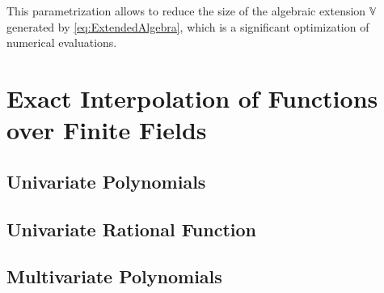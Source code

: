 This parametrization allows to reduce the size of the algebraic extension $\mathbb{V}$ generated by \cref{eq:ExtendedAlgebra},
which is a significant optimization of numerical evaluations.




\section{Exact Interpolation of Functions over Finite Fields}
\label{sec:func_reconstruction}

\subsection{Univariate Polynomials}
\label{sec:newton}

\subsection{Univariate Rational Function}
\label{sec:thiele}

\subsection{Multivariate Polynomials}
\label{sec:newton_rec}



